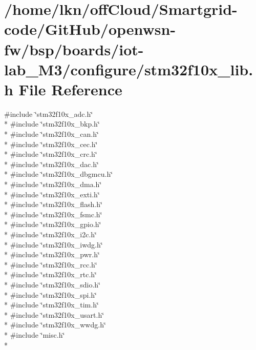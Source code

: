 \hypertarget{iot-lab___m3_2configure_2stm32f10x__lib_8h}{}\section{/home/lkn/off\+Cloud/\+Smartgrid-\/code/\+Git\+Hub/openwsn-\/fw/bsp/boards/iot-\/lab\+\_\+\+M3/configure/stm32f10x\+\_\+lib.h File Reference}
\label{iot-lab___m3_2configure_2stm32f10x__lib_8h}
{\ttfamily \#include \char`\"{}stm32f10x\+\_\+adc.\+h\char`\"{}}\\*
{\ttfamily \#include \char`\"{}stm32f10x\+\_\+bkp.\+h\char`\"{}}\\*
{\ttfamily \#include \char`\"{}stm32f10x\+\_\+can.\+h\char`\"{}}\\*
{\ttfamily \#include \char`\"{}stm32f10x\+\_\+cec.\+h\char`\"{}}\\*
{\ttfamily \#include \char`\"{}stm32f10x\+\_\+crc.\+h\char`\"{}}\\*
{\ttfamily \#include \char`\"{}stm32f10x\+\_\+dac.\+h\char`\"{}}\\*
{\ttfamily \#include \char`\"{}stm32f10x\+\_\+dbgmcu.\+h\char`\"{}}\\*
{\ttfamily \#include \char`\"{}stm32f10x\+\_\+dma.\+h\char`\"{}}\\*
{\ttfamily \#include \char`\"{}stm32f10x\+\_\+exti.\+h\char`\"{}}\\*
{\ttfamily \#include \char`\"{}stm32f10x\+\_\+flash.\+h\char`\"{}}\\*
{\ttfamily \#include \char`\"{}stm32f10x\+\_\+fsmc.\+h\char`\"{}}\\*
{\ttfamily \#include \char`\"{}stm32f10x\+\_\+gpio.\+h\char`\"{}}\\*
{\ttfamily \#include \char`\"{}stm32f10x\+\_\+i2c.\+h\char`\"{}}\\*
{\ttfamily \#include \char`\"{}stm32f10x\+\_\+iwdg.\+h\char`\"{}}\\*
{\ttfamily \#include \char`\"{}stm32f10x\+\_\+pwr.\+h\char`\"{}}\\*
{\ttfamily \#include \char`\"{}stm32f10x\+\_\+rcc.\+h\char`\"{}}\\*
{\ttfamily \#include \char`\"{}stm32f10x\+\_\+rtc.\+h\char`\"{}}\\*
{\ttfamily \#include \char`\"{}stm32f10x\+\_\+sdio.\+h\char`\"{}}\\*
{\ttfamily \#include \char`\"{}stm32f10x\+\_\+spi.\+h\char`\"{}}\\*
{\ttfamily \#include \char`\"{}stm32f10x\+\_\+tim.\+h\char`\"{}}\\*
{\ttfamily \#include \char`\"{}stm32f10x\+\_\+usart.\+h\char`\"{}}\\*
{\ttfamily \#include \char`\"{}stm32f10x\+\_\+wwdg.\+h\char`\"{}}\\*
{\ttfamily \#include \char`\"{}misc.\+h\char`\"{}}\\*
